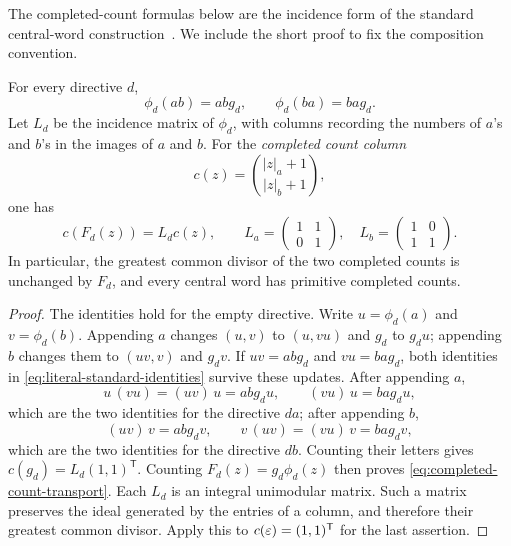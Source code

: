 The completed-count formulas below are the incidence form of the
standard central-word construction~\cite[Corollaries~3.1--3.2]{BertheDeLucaReutenauer2008}.
We include the short proof to fix the composition convention.

\begin{lemma}
\label{lem:standard-identities}
For every directive $d$,
\begin{equation}\label{eq:literal-standard-identities}
 \phi_d(ab)=abg_d,\qquad \phi_d(ba)=bag_d.
\end{equation}
Let $L_d$ be the incidence matrix of $\phi_d$, with columns recording
the numbers of $a$'s and $b$'s in the images of $a$ and $b$.
For the \emph{completed count column}
$$
 c(z)=\binom{|z|_a+1}{|z|_b+1},
$$
one has
\begin{equation}\label{eq:completed-count-transport}
 c(F_d(z))=L_dc(z),\qquad
 L_a=\begin{pmatrix}1&1\\0&1\end{pmatrix},\quad
 L_b=\begin{pmatrix}1&0\\1&1\end{pmatrix}.
\end{equation}
In particular, the greatest common divisor of the two completed
counts is unchanged by $F_d$, and every central word has primitive
completed counts.
\end{lemma}

\begin{proof}
The identities hold for the empty directive. Write $u=\phi_d(a)$
and $v=\phi_d(b)$. Appending $a$ changes $(u,v)$ to $(u,vu)$ and
$g_d$ to $g_du$; appending $b$ changes them to $(uv,v)$ and $g_dv$.
If $uv=abg_d$ and $vu=bag_d$, both identities in
\eqref{eq:literal-standard-identities} survive these updates. After
appending $a$,
$$
 u\,(vu)=(uv)\,u=abg_du,\qquad (vu)\,u=bag_du,
$$
which are the two identities for the directive $da$; after appending $b$,
$$
 (uv)\,v=abg_dv,\qquad v\,(uv)=(vu)\,v=bag_dv,
$$
which are the two identities for the directive $db$.
Counting their letters gives
$c(g_d)=L_d(1,1)^{\mathsf T}$. Counting
$F_d(z)=g_d\phi_d(z)$ then proves
\eqref{eq:completed-count-transport}. Each $L_d$ is an integral
unimodular matrix. Such a matrix preserves the ideal generated by
the entries of a column, and therefore their greatest common divisor.
Apply this to $c(\varepsilon)=(1,1)^{\mathsf T}$ for the last assertion.
\end{proof}

